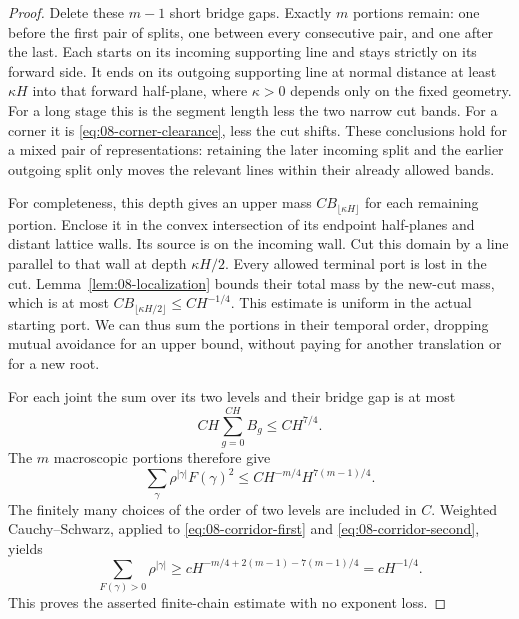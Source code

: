 \begin{proof}
Delete these $m-1$ short bridge gaps. Exactly $m$ portions remain: one
before the first pair of splits, one between every consecutive pair, and
one after the last. Each starts on its incoming supporting line and
stays strictly on its forward side. It ends on its outgoing supporting
line at normal distance at least $\kappa H$ into that forward half-plane,
where $\kappa>0$ depends only on the fixed geometry. For a long stage this
is the segment length less the two narrow cut bands. For a corner it is
\eqref{eq:08-corner-clearance}, less the cut shifts. These conclusions
hold for a mixed pair of representations: retaining the later incoming
split and the earlier outgoing split only moves the relevant lines
within their already allowed bands.

For completeness, this depth gives an upper mass $CB_{\lfloor\kappa H\rfloor}$
for each remaining portion. Enclose it in the convex intersection of
its endpoint half-planes and distant lattice walls. Its source is on
the incoming wall. Cut this domain by a line parallel to that wall at
depth $\kappa H/2$. Every allowed terminal port is lost in the cut.
Lemma~\ref{lem:08-localization} bounds their total mass by the new-cut
mass, which is at most $CB_{\lfloor\kappa H/2\rfloor}\le CH^{-1/4}$.
This estimate is uniform in the actual starting port. We can thus sum
the portions in their temporal order, dropping mutual avoidance for an
upper bound, without paying for another translation or for a new root.

For each joint the sum over its two levels and their bridge gap is at
most
\[
 CH\sum_{g=0}^{CH}B_g\le CH^{7/4}.
\]
The $m$ macroscopic portions therefore give
\begin{equation}\label{eq:08-corridor-second}
 \sum_\gamma\rho^{|\gamma|}F(\gamma)^2
 \le CH^{-m/4}H^{7(m-1)/4}.
\end{equation}
The finitely many choices of the order of two levels are included in
$C$. Weighted Cauchy--Schwarz, applied to
\eqref{eq:08-corridor-first} and \eqref{eq:08-corridor-second}, yields
\[
 \sum_{F(\gamma)>0}\rho^{|\gamma|}
 \ge cH^{-m/4+2(m-1)-7(m-1)/4}=cH^{-1/4}.
\]
This proves the asserted finite-chain estimate with no exponent loss.


\end{proof}
